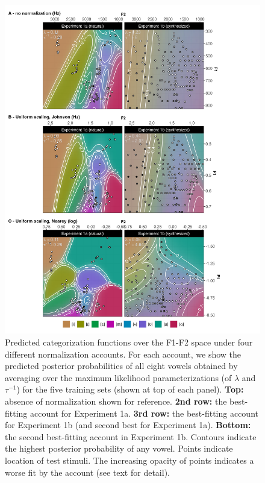 \documentclass[preprint]{JASA}
\begin{document}
\begin{figure}[!ht]

{\centering \includegraphics[width=0.8\linewidth]{../../figures/p.prediction-landscapes-study1} 

}

\caption{Predicted categorization functions over the F1-F2 space under four different normalization accounts. For each account, we show the predicted posterior probabilities of all eight vowels obtained by averaging over the maximum likelihood parameterizations (of \(\lambda\) and \(\tau^{-1}\)) for the five training sets (shown at top of each panel). \textbf{Top:} absence of normalization shown for reference. \textbf{2nd row:} the best-fitting account for Experiment 1a. \textbf{3rd row:} the best-fitting account for Experiment 1b (and second best for Experiment 1a). \textbf{Bottom:} the second best-fitting account in Experiment 1b. Contours indicate the highest posterior probability of any vowel. Points indicate location of test stimuli. The increasing opacity of points indicates a worse fit by the account (see text for detail).}\label{fig:prediction-landscapes-optim-io}
\end{figure}
\end{document}

